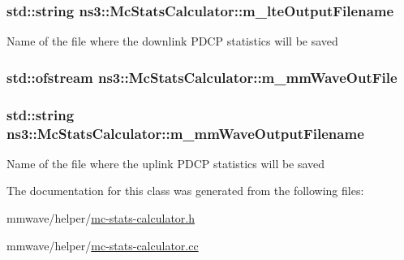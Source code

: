 \subsubsection[{\texorpdfstring{m\+\_\+lte\+Output\+Filename}{m_lteOutputFilename}}]{\setlength{\rightskip}{0pt plus 5cm}std\+::string ns3\+::\+Mc\+Stats\+Calculator\+::m\+\_\+lte\+Output\+Filename\hspace{0.3cm}{\ttfamily [private]}}\hypertarget{classns3_1_1McStatsCalculator_a8a0bf6a1e0eec7cf193bf72d3f04a871}{}\label{classns3_1_1McStatsCalculator_a8a0bf6a1e0eec7cf193bf72d3f04a871}
Name of the file where the downlink P\+D\+CP statistics will be saved 
\subsubsection[{\texorpdfstring{m\+\_\+mm\+Wave\+Out\+File}{m_mmWaveOutFile}}]{\setlength{\rightskip}{0pt plus 5cm}std\+::ofstream ns3\+::\+Mc\+Stats\+Calculator\+::m\+\_\+mm\+Wave\+Out\+File\hspace{0.3cm}{\ttfamily [private]}}\hypertarget{classns3_1_1McStatsCalculator_affb91cbd165376d7e0a6a822326ea60d}{}\label{classns3_1_1McStatsCalculator_affb91cbd165376d7e0a6a822326ea60d}
\subsubsection[{\texorpdfstring{m\+\_\+mm\+Wave\+Output\+Filename}{m_mmWaveOutputFilename}}]{\setlength{\rightskip}{0pt plus 5cm}std\+::string ns3\+::\+Mc\+Stats\+Calculator\+::m\+\_\+mm\+Wave\+Output\+Filename\hspace{0.3cm}{\ttfamily [private]}}\hypertarget{classns3_1_1McStatsCalculator_ab290568007b5006b54a91b42440c465a}{}\label{classns3_1_1McStatsCalculator_ab290568007b5006b54a91b42440c465a}
Name of the file where the uplink P\+D\+CP statistics will be saved 

The documentation for this class was generated from the following files\+:\begin{DoxyCompactItemize}
\item 
mmwave/helper/\hyperlink{mc-stats-calculator_8h}{mc-\/stats-\/calculator.\+h}\item 
mmwave/helper/\hyperlink{mc-stats-calculator_8cc}{mc-\/stats-\/calculator.\+cc}\end{DoxyCompactItemize}
